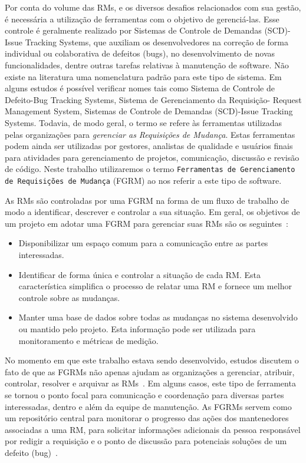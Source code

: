 Por conta do volume das RMs, e os diversos desafios relacionados com sua gestão,
é necessária a utilização de ferramentas com o objetivo de gerenciá-las. Esse
controle é geralmente realizado por Sistemas de Controle de Demandas (SCD)\@-\@
Issue Tracking Systems, que auxiliam os desenvolvedores na correção de forma
individual ou colaborativa de defeitos (bugs), no desenvolvimento de novas
funcionalidades, dentre outras tarefas relativas à manutenção de software. Não
existe na literatura uma nomenclatura padrão para este tipo de sistema. Em
alguns estudos é possível verificar nomes tais como Sistema de Controle de
Defeito\@-\@ Bug Tracking Systems, Sistema de Gerenciamento da Requisição\@-\@
Request Management System, Sistemas de Controle de Demandas (SCD)\@-\@ Issue
Tracking Systems. Todavia, de modo geral, o termo se refere às ferramentas
utilizadas pelas organizações para \textit{gerenciar as Requisições de Mudança}.
Estas ferramentas podem ainda ser utilizadas por gestores, analistas de
qualidade e usuários finais para atividades para gerenciamento de projetos,
comunicação, discussão e revisão de código. Neste trabalho utilizaremos o termo
\texttt{Ferramentas de Gerenciamento de Requisições de Mudança} (FGRM) ao nos
referir a este tipo de software.

As RMs são controladas por uma FGRM na forma de um fluxo de trabalho de modo a
identificar, descrever e controlar a sua situação. Em geral, os objetivos de um
projeto em adotar uma FGRM para gerenciar suas RMs são os
seguintes~\cite{tripathy2014software}:

\begin{itemize}
    \item Disponibilizar um espaço comum para a comunicação entre as partes
        interessadas.
	\item Identificar de forma única e controlar a situação de cada RM\@. Esta
		característica simplifica o processo de relatar uma RM e fornece um
		melhor controle sobre as mudanças.
    \item Manter uma base de dados sobre todas as mudanças no sistema
        desenvolvido ou mantido pelo projeto. Esta informação pode ser utilizada
        para monitoramento e métricas de medição.
\end{itemize}

No momento em que este trabalho estava sendo desenvolvido, estudos discutem o
fato de que as FGRMs não apenas ajudam as organizações a gerenciar, atribuir,
controlar, resolver e arquivar as RMs~\cite{Bertram:2010:CCB:1718918.1718972}.
Em alguns casos, este tipo de ferramenta se tornou o ponto focal para
comunicação e coordenação para diversas partes interessadas, dentro e além da
equipe de manutenção. As FGRMs servem como um repositório central para monitorar
o progresso das ações dos mantenedores associadas a uma RM, para solicitar
informações adicionais da pessoa responsável por redigir a requisição e o ponto
de discussão para potenciais soluções de um defeito
(bug)~\cite{zimmermann2009improving}.

